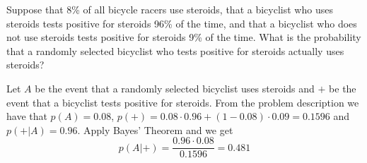 \documentclass[../main.tex]{subfiles}
\begin{document}
Suppose that 8\% of all bicycle racers use steroids, that a bicyclist who uses steroids tests positive for steroids 96\% of the time, and that a bicyclist who does not use steroids tests positive for steroids 9\% of the time.
What is the probability that a randomly selected bicyclist who tests positive for steroids actually uses steroids?

\solution

Let $A$ be the event that a randomly selected bicyclist uses steroids and $+$ be the event that a bicyclist tests positive for steroids.
From the problem description we have that $p(A) = 0.08$, $p(+) = 0.08\cdot 0.96 + (1-0.08)\cdot 0.09 = 0.1596$ and $p(+|A) = 0.96$.
Apply Bayes' Theorem and we get
\[ p(A|+) = \frac{0.96 \cdot 0.08}{0.1596} = 0.481 \]
\end{document}
